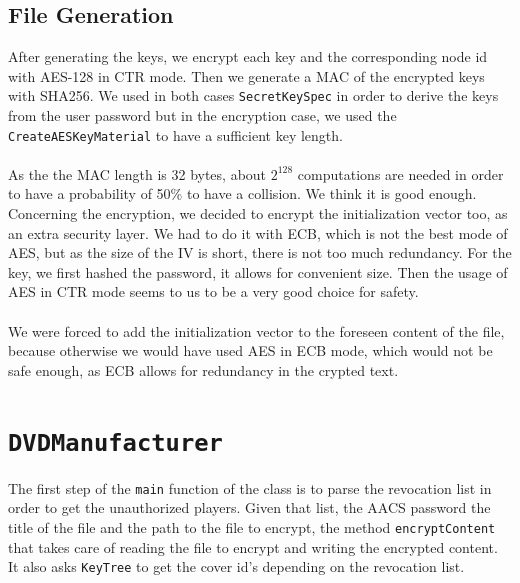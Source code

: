 \documentclass[a4paper,titlepage]{article}
\begin{document}
	\subsection{File Generation}
	After generating the keys, we encrypt each key and the corresponding node id with AES-128 in CTR mode. Then we generate a MAC of the encrypted   	keys with SHA256. We used in both cases \texttt{SecretKeySpec} in order to derive the keys from the user password but in the encryption case, we used the \texttt{CreateAESKeyMaterial} to have a sufficient key length. \\ \\ 
	As the the MAC length is 32 bytes, about $2^{128}$ computations are needed in order to have a probability of 50\% to have a collision. We think it is good enough. Concerning the encryption, we decided to encrypt the initialization vector too, as an extra security layer. We had to do it with ECB, which is not the best mode of AES, but as the size of the IV is short, there is not too much redundancy. For the key, we first hashed the password, it allows for convenient size. Then the usage of AES in CTR mode seems to us to be a very good choice for safety. \\ \\
	We were forced to add the initialization vector to the foreseen content of the file, because otherwise we would have used AES in ECB mode, which would not be safe enough, as ECB allows for redundancy in the crypted text.

\section{\texttt{DVDManufacturer}}

The first step of the \texttt{main} function of the class is to parse the revocation list in order to get the unauthorized players. Given that list, the AACS password the title of the file and the path to the file to encrypt, the method \texttt{encryptContent} that takes care of reading the file to encrypt and writing the encrypted content. It also asks \texttt{KeyTree} to get the cover id's depending on the revocation list.
\end{document}
